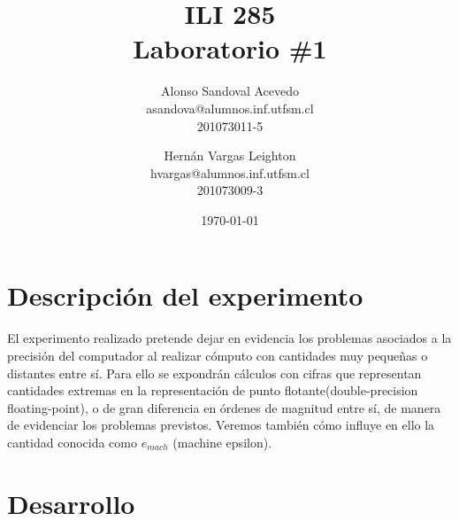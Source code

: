 \documentclass[spanish, fleqn]{article}
\title{ILI 285 \\
       Laboratorio \#1 \\
      }
\author{Alonso Sandoval Acevedo\\asandova@alumnos.inf.utfsm.cl\\201073011-5 \and 
		Hernán Vargas Leighton\\hvargas@alumnos.inf.utfsm.cl\\201073009-3}
\date{\today}
\begin{document}
\maketitle

\thispagestyle{empty}

\section{Descripción del experimento}
	El experimento realizado pretende dejar en evidencia los problemas asociados
	a la precisión del computador al realizar cómputo con cantidades muy
	pequeñas o distantes entre sí. Para ello se expondrán cálculos con cifras
	que representan cantidades extremas en la representación de punto
	flotante(double-precision floating-point), o de gran diferencia en órdenes
	de magnitud entre sí, de manera de evidenciar los problemas previstos.
	Veremos también cómo influye en ello la cantidad conocida como $e_{mach}$
	(machine epsilon). 
\section{Desarrollo}
\end{document}
